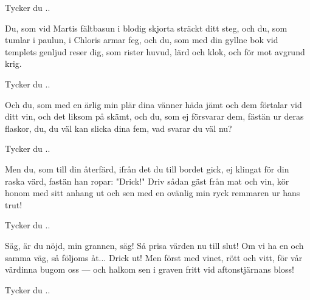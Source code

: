 \beginchorus						%
Tycker du ..
\endchorus

\beginverse*
Du, som vid Martis fältbasun
i blodig skjorta sträckt ditt steg,
och du, som tumlar i paulun,
i Chloris armar feg,
och du, som med din gyllne bok
vid templets genljud reser dig,
som rister huvud, lärd och klok,
och för mot avgrund krig.
\endverse

\beginchorus						%
Tycker du ..
\endchorus

\beginverse*
Och du, som med en ärlig min
plär dina vänner häda jämt
och dem förtalar vid ditt vin,
och det liksom på skämt,
och du, som ej försvarar dem,
fästän ur deras flaskor, du,
du väl kan slicka dina fem,
vad svarar du väl nu?
\endverse

\beginchorus						%
Tycker du ..
\endchorus

\beginverse*
Men du, som till din återfärd,
ifrån det du till bordet gick,
ej klingat för din raska värd,
fastän han ropar: "Drick!"
Driv sådan gäst från mat och vin,
kör honom med sitt anhang ut
och sen med en ovänlig min
ryck remmaren ur hans trut!
\endverse

\beginchorus						%
Tycker du ..
\endchorus

\beginverse*
Säg, är du nöjd, min grannen, säg!
Så prisa värden nu till slut!
Om vi ha en och samma väg,
så följoms åt... Drick ut!
Men först med vinet, rött och vitt,
för vår värdinna bugom oss —
och halkom sen i graven fritt
vid aftonstjärnans bloss!
\endverse

\beginchorus						%
Tycker du ..
\endchorus

\endsong							%